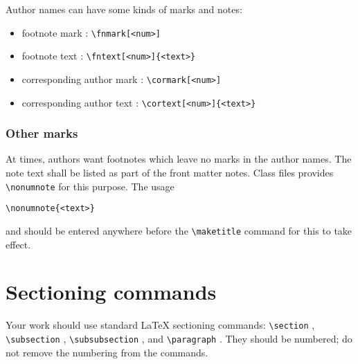 \documentclass[%
twocolumn
]{ceurart}
\begin{document}
Author names can have some kinds of marks and notes:
\begin{itemize}
\item footnote mark :
\verb|\fnmark[<num>]|

\item footnote text :
\verb|\fntext[<num>]{<text>}|

\item corresponding author mark :
\verb|\cormark[<num>]|

\item corresponding author text :
\verb|\cortext[<num>]{<text>}|

\end{itemize}

\subsubsection{Other marks}

At times, authors want footnotes which leave no marks in the author names. The note text shall be listed as part of the front matter notes. Class files provides
\verb|\nonumnote|
 for this purpose. The usage
\begin{lstlisting}[language={[latex]TeX}]
\nonumnote{<text>}
\end{lstlisting}
and should be entered anywhere before the
\verb|\maketitle|
 command for this to take effect.

\section{Sectioning commands}

Your work should use standard \LaTeX{} sectioning commands:
\verb|\section|%
,
\verb|\subsection|%
,
\verb|\subsubsection|%
, and
\verb|\paragraph|%
.
They should be numbered; do not remove the numbering from the commands.
\end{document}
